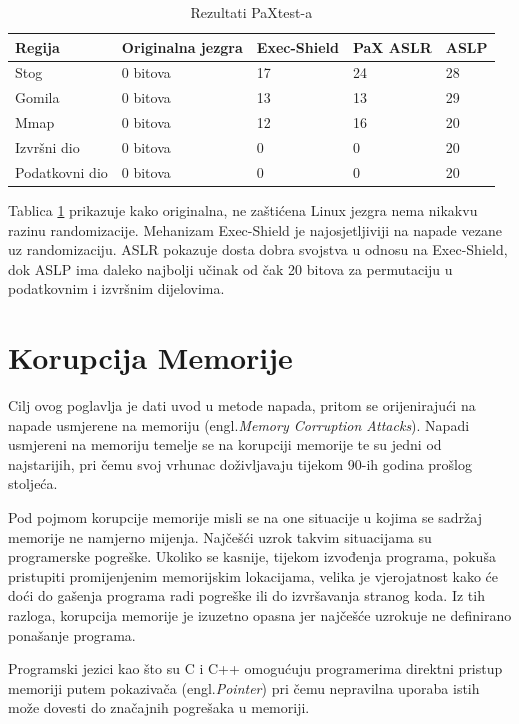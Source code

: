 \documentclass[times, utf8, diplomski, numeric]{fer}
\begin{document}
\begin{table}[htb]
\small
\caption{Rezultati PaXtest-a}
\label{tbl:paxtest_results}
\centering
\begin{tabular}{|l|l|l|l|l|}
\hline
Regija & Originalna jezgra & Exec-Shield & PaX ASLR & ASLP \\ \hline
Stog & 0 bitova & 17 & 24 & 28 \\ \hline
Gomila & 0 bitova & 13 & 13 & 29 \\ \hline
Mmap & 0 bitova & 12 & 16 & 20 \\ \hline
Izvršni dio & 0 bitova & 0 & 0 & 20 \\ \hline
Podatkovni dio & 0 bitova & 0 & 0 & 20 \\ \hline
\end{tabular}
\end{table}
Tablica \ref{tbl:paxtest_results} prikazuje kako originalna, ne zaštićena Linux jezgra nema nikakvu razinu randomizacije. Mehanizam Exec-Shield je najosjetljiviji na napade vezane uz randomizaciju. ASLR pokazuje dosta dobra svojstva u odnosu na Exec-Shield, dok ASLP ima daleko najbolji učinak od čak 20 bitova za permutaciju u podatkovnim i izvršnim dijelovima.

\chapter{Korupcija Memorije}
Cilj ovog poglavlja je dati uvod u metode napada, pritom se orijenirajući na napade usmjerene na memoriju (engl.\emph{Memory Corruption Attacks}).  Napadi usmjereni na memoriju temelje se na korupciji memorije te su jedni od najstarijih, pri čemu svoj vrhunac doživljavaju tijekom 90-ih godina prošlog stoljeća. 

Pod pojmom korupcije memorije misli se na one situacije u kojima se sadržaj memorije ne namjerno mijenja. Najčešći uzrok takvim situacijama su programerske pogreške. Ukoliko se kasnije, tijekom izvođenja programa, pokuša pristupiti promijenjenim memorijskim lokacijama, velika je vjerojatnost kako će doći do gašenja programa radi pogreške ili do izvršavanja stranog koda. Iz tih razloga, korupcija memorije je izuzetno opasna jer najčešće uzrokuje ne definirano ponašanje programa. 

Programski jezici kao što su C i C++ omogućuju programerima direktni pristup memoriji putem pokazivača (engl.\emph{Pointer}) pri čemu nepravilna uporaba istih može dovesti do značajnih pogrešaka u memoriji. 
\end{document}
